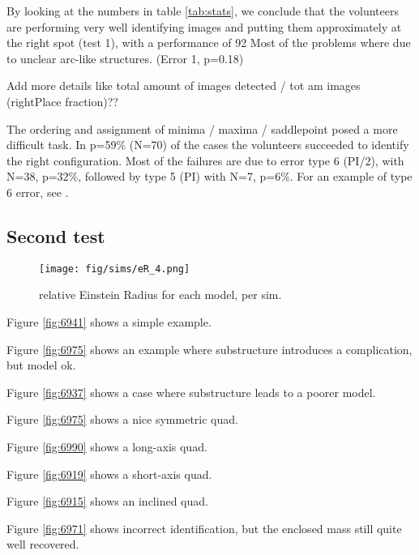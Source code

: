 

By looking at the numbers in table \ref{tab:stats}, we conclude that the volunteers are performing very well identifying images and putting them approximately at the right spot (test 1), with a performance of 92%
Most of the problems where due to unclear arc-like structures. (Error 1, p=0.18)

 Add more details like total amount of images detected / tot am images (rightPlace fraction)??

The ordering and assignment of minima / maxima / saddlepoint posed a more difficult task.
In p=59\% (N=70) of the cases the volunteers succeeded to identify the right configuration.
Most of the failures are due to error type 6 (PI/2), with N=38, p=32\%, followed by type 5 (PI) with N=7, p=6\%.
For an example of type 6 error, see .










\subsection{Second test} \label{sec:results.2}



\begin{figure}[htbp]
  \centering
    \texttt{[image: fig/sims/eR\_4.png]}
  \caption{relative Einstein Radius for each model, per sim. }
  \label{fig:eR_all}
\end{figure}




\hr

Figure \ref{fig:6941} shows a simple example.

Figure \ref{fig:6975} shows an example where substructure introduces a
complication, but model ok.

Figure \ref{fig:6937} shows a case where substructure leads to a
poorer model.

Figure \ref{fig:6975} shows a nice symmetric quad.

Figure \ref{fig:6990} shows a long-axis quad.

Figure \ref{fig:6919} shows a short-axis quad.

Figure \ref{fig:6915} shows an inclined quad.

Figure \ref{fig:6971} shows incorrect identification, but the enclosed
mass still quite well recovered.




\clearpage
